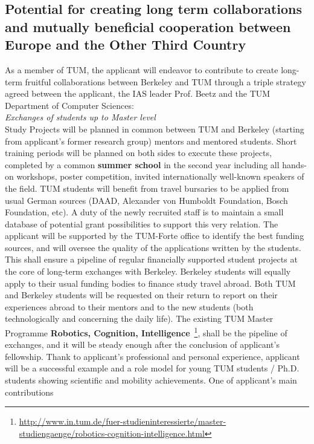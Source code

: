 \subsection{Potential for creating long term collaborations and mutually beneficial cooperation between 
Europe and the Other Third Country} 
As a member of TUM, the applicant  will endeavor to contribute to create long-term
fruitful  collaborations  between  Berkeley and TUM through  a triple strategy 
agreed between the applicant, the IAS  leader Prof.  Beetz and the  TUM Department  
of  Computer Sciences:\\
\emph{Exchanges  of students  up  to  Master level}\\  
Study  Projects will  be planned in common between TUM and  Berkeley
(starting  from  applicant's  former   research  group)  mentors  and  mentored
students.  Short training  periods will  be planned  on both  sides to
execute these  projects, completed  by a common  \textbf{summer school}  in the
second  year  including all  hands-on  workshops, poster  competition,
invited  internationally  well-known   speakers  of  the  field.   TUM
students will benefit  from travel bursaries to be  applied from usual
German  sources  (DAAD,   Alexander  von  Humboldt  Foundation,  Bosch
Foundation, etc). A duty of  the newly recruited staff is to maintain
a small database of potential grant possibilities to support this very
relation. The applicant will be supported  by the TUM-Forte office to identify the
best  funding  sources,  and    will  oversee  the  quality  of  the
applications written by the students.  This shall ensure a pipeline of
regular  financially  supported  student   projects  at  the  core  of
long-term  exchanges  with   Berkeley. Berkeley  students will equally  apply to
their usual funding bodies to finance study travel abroad.  Both TUM and
Berkeley students  will be  requested on
their return  to report on  their experiences abroad to  their mentors
and to the new students (both technologically and concerning the daily
life).   The  existing  TUM  Master  Programme  \textbf{Robotics,  Cognition,
Intelligence}~\footnote{\url{http://www.in.tum.de/fuer-studieninteressierte/master-studiengaenge/robotics-cognition-intelligence.html}}, 
shall  be the  pipeline of exchanges,  and it  will be
steady  enough after  the conclusion  of applicant's  fellowship.  Thank  to applicant's
professional and  personal experience, applicant will be  a successful example
and  a role  model for  young TUM  students /  Ph.D.  students showing
scientific  and mobility  achievements. One  of applicant's  main contributions
